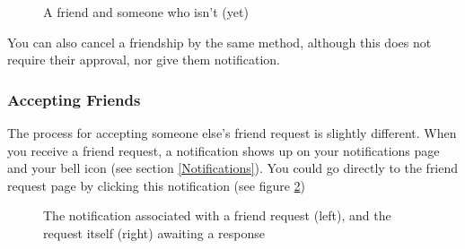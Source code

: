 \documentclass[10pt]{article}
\begin{document}
\begin{figure}[H]
    \caption{A friend and someone who isn't (yet)}
    \label{friendyesno}
\end{figure}

\begin{flushleft}
You can also cancel a friendship by the same method, although this does not require their approval, nor give them notification.
\end{flushleft}

\subsubsection{Accepting Friends}
\begin{flushleft}
The process for accepting someone else's friend request is slightly different.  When you receive a friend request, a notification shows up on your notifications page and your bell icon (see section \ref{Notifications}).  You could go directly to the friend request page by clicking this notification (see figure \ref{request})
\end{flushleft}


\begin{figure}[h]
    \centering
    \qquad
    \caption{The notification associated with a friend request (left), and the request itself (right) awaiting a response}
    \label{request}
\end{figure}
\end{document}
